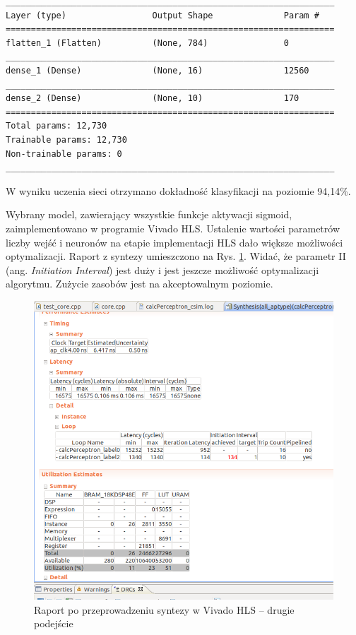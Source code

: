 \begin{verbatim}
_________________________________________________________________
Layer (type)                 Output Shape              Param #   
=================================================================
flatten_1 (Flatten)          (None, 784)               0         
_________________________________________________________________
dense_1 (Dense)              (None, 16)                12560     
_________________________________________________________________
dense_2 (Dense)              (None, 10)                170       
=================================================================
Total params: 12,730
Trainable params: 12,730
Non-trainable params: 0
_________________________________________________________________
\end{verbatim}

W wyniku uczenia sieci otrzymano dokładność klasyfikacji na poziomie 94,14\%.

Wybrany model, zawierający wszystkie funkcje aktywacji sigmoid, zaimplementowano w programie Vivado HLS. Ustalenie wartości parametrów liczby wejść i neuronów na etapie implementacji HLS dało większe możliwości optymalizacji. Raport z syntezy umieszczono na Rys. \ref{hls-report2}. Widać, że parametr II (ang. \emph{Initiation Interval}) jest duży i jest jeszcze możliwość optymalizacji algorytmu. Zużycie zasobów jest na akceptowalnym poziomie.

\begin{figure}[!h]
  \centering
  \includegraphics[width=\textwidth]{img/hls-report2.png}
  \caption{Raport po przeprowadzeniu syntezy w Vivado HLS -- drugie podejście}
  \label{hls-report2}
\end{figure}

